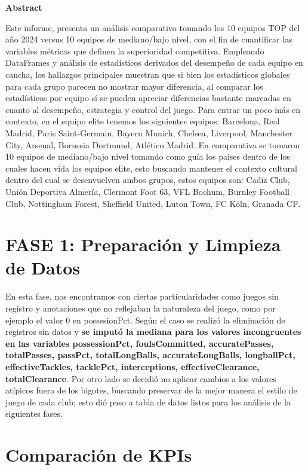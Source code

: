 \documentclass[12pt,a4paper]{article}
\begin{document}
	\vspace*{1cm}
	\begin{center}
	{\Large\textbf{Abstract}}\\[0.3cm]
	\end{center} 
	Este informe, presenta un análisis comparativo tomando los 10 equipos TOP del año 2024 versus 10 equipos de mediano/bajo nivel, con el fin de cuantificar las variables métricas que definen la superioridad competitiva. Empleando DataFrames y análisis de estadísticos derivados del desempeño de cada equipo en cancha, los hallazgos principales muestran que si bien los estadísticos globales para cada grupo parecen no mostrar mayor diferencia, al comparar los estadísticos por equipo sí se pueden apreciar diferencias bastante marcadas en cuanto al desempeño, estrategia y control del juego. 
	Para entrar un poco más en contexto, en el equipo elite tenemos los siguientes equipos: Barcelona, Real Madrid, Paris Saint-Germain, Bayern Munich, Chelsea,
	Liverpool, Manchester City, Arsenal, Borussia Dortmund, Atlético Madrid.
	En comparativa se tomaron 10 equipos de mediano/bajo nivel tomando como guía los paises dentro de los cuales hacen vida los equipos elite, esto buscando mantener el contexto cultural dentro del cual se desenvuelven ambos grupos, estos equipos son: Cadiz Club, Unión Deportiva Almería, Clermont Foot 63, VFL Bochum, Burnley Football Club, Nottingham Forest, Sheffield United, Luton Town, FC Köln, Granada CF.
	\newpage
	\section{FASE 1: Preparación y Limpieza de Datos}
	En esta fase, nos encontramos con ciertas particularidades como juegos sin registro y anotaciones que no reflejaban la naturaleza del juego, como por ejemplo el valor 0 en possesionPct.  Según el caso se realizó la eliminación de registros sin datos y \textbf{se imputó la mediana para los valores incongruentes en las variables possessionPct, foulsCommitted, accuratePasses, totalPasses, passPct, totalLongBalls, accurateLongBalls, longballPct, effectiveTackles, tacklePct, interceptions, effectiveClearance, totalClearance}. Por otro lado se decidió no aplicar cambios a los valores atípicos fuera de los bigotes, buscando preservar de la mejor manera el estilo de juego de cada club; esto dió paso a tabla de datos listos para los análisis de la siguientes fases.
	\\[0.3cm]
		\section{Comparación de KPIs}
		
\end{document}
